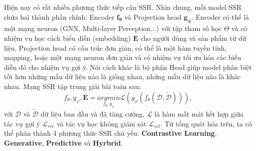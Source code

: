 Hiện nay có rất nhiều phương thức tiếp cận SSR. Nhìn chung, mỗi model SSR chứa hai thành phần \cite{survey:ssl-for-rec-sys} chính: Encoder $\bm{f_\theta}$ và Projection head $\bm{g_\varphi}$. Encoder có thể là một mạng neuron (GNN, Multi-layer Perception...) với tập tham số học $\Theta$ và có nhiệm vụ học cách biểu diễn (embedding) $\mathbf{E}$ cho người dùng và sản phẩm từ dữ liệu. Projection head có cấu trúc đơn giản, có thể là một hàm tuyến tính, mapping, hoặc một mạng neuron đơn giản và có nhiệm vụ tối ưu hóa các biểu diễn đó cho nhiệm vụ gợi ý. Nói cách khác là bộ phận Head giúp model phân biệt tốt hơn những mẫu dữ liệu nào là giống nhau, những mẫu dữ liệu nào là khác nhau. Mạng SSR tập trung giải bài toán sau:
\begin{equation}
    f_\theta, g_\varphi, \mathbf{E} = \underset{f_\theta, g_\varphi}{arg min}\mathcal{L}\left(g_\varphi(f_\theta(\mathcal{D}, \tilde{\mathcal{D}}))\right),
\end{equation}
với $\mathcal{D}$ và $\tilde{\mathcal{D}}$ dữ liệu ban đầu và đã tăng cường, $\mathcal{L}$ là hàm mất mát kết hợp giữa tác vụ gợi ý $\mathcal{L}_\textit{rec}$ và tác vụ học không giám sát $\mathcal{L}_\textit{ssl}$. Từ tổng quát hóa trên, ta có thể phân thành 4 phương thức \cite{survey:ssl-for-rec-sys} SSR chủ yếu: \textbf{Contrastive Learning}, \textbf{Generative}, \textbf{Predictive} và \textbf{Hyrbrid}.
